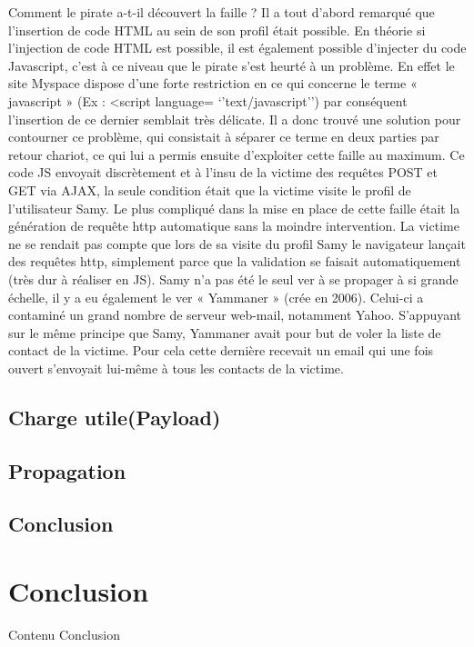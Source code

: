 \documentclass[a4paper,12pt]{report}
\begin{document}
Comment le pirate a-t-il découvert la faille ?
Il a tout d’abord remarqué que l’insertion de code HTML au sein de son profil était possible. En théorie si l’injection de code HTML est possible, il est également possible d’injecter du code Javascript, c’est à ce niveau que le pirate s’est heurté à un problème. En effet le site Myspace dispose d’une forte restriction en ce qui concerne le terme « javascript » (Ex : <script language= ‘’text/javascript’’) par conséquent l’insertion de ce dernier semblait très délicate. Il a donc trouvé une solution pour contourner ce problème, qui consistait à séparer ce terme en deux parties par retour chariot, ce qui lui a permis ensuite d’exploiter cette faille au maximum.
Ce code JS envoyait discrètement et à l’insu de la victime des requêtes POST et GET via AJAX, la seule condition était que la victime visite le profil de l’utilisateur Samy. Le plus compliqué dans la mise en place de cette faille était la génération de requête http automatique sans la moindre intervention. La victime ne se rendait pas compte que lors de sa visite du profil Samy le navigateur lançait des requêtes http, simplement parce que la validation se faisait automatiquement (très dur à réaliser en JS).
Samy n’a pas été le seul ver à se propager à si grande échelle, il y a eu également le ver « Yammaner » (crée en 2006). Celui-ci a contaminé un grand nombre de serveur web-mail, notamment Yahoo. S’appuyant sur le même principe que Samy, Yammaner avait pour but de voler la liste de contact de la victime. Pour cela cette dernière recevait un email qui une fois ouvert s’envoyait lui-même à tous les contacts de la victime.


    \newpage
    \section{Charge utile(Payload)}


    \newpage

    \section{Propagation}

    \newpage


    \section{Conclusion}

    \newpage

  \chapter*{Conclusion} %
    Contenu Conclusion
\end{document}
